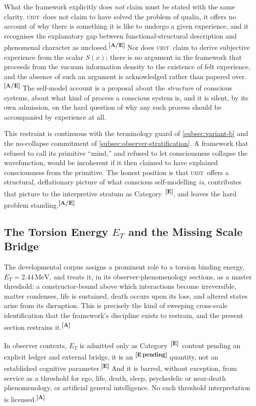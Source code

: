 \documentclass[12pt,a4paper,twoside]{article}
\theoremstyle{plain}
\theoremstyle{definition}
\theoremstyle{remark}
\newcommand{\UIDT}{\textsc{uidt}}
\newcommand{\MeV}{\,\mathrm{MeV}}
\newcommand{\catmark}[1]{\textsuperscript{\textsf{\textbf{[#1]}}}}
\newcommand{\ETorsion}{2.44\MeV} %
\begin{document}
What the framework explicitly does \emph{not} claim must be stated with the same clarity. \UIDT\ does not claim to have solved the problem of qualia, it offers no account of why there is something it is like to undergo a given experience, and it recognises the explanatory gap between functional-structural description and phenomenal character as unclosed.\catmark{A/E} Nor does \UIDT\ claim to derive subjective experience from the scalar $S(x)$; there is no argument in the framework that proceeds from the vacuum information density to the existence of felt experience, and the absence of such an argument is acknowledged rather than papered over.\catmark{A/E} The self-model account is a proposal about the \emph{structure} of conscious systems, about what kind of process a conscious system is, and it is silent, by its own admission, on the hard question of why any such process should be accompanied by experience at all.

This restraint is continuous with the terminology guard of \cref{subsec:variant-b} and the no-collapse commitment of \cref{subsec:observer-stratification}. A framework that refused to call its primitive ``mind,'' and refused to let consciousness collapse the wavefunction, would be incoherent if it then claimed to have explained consciousness from the primitive. The honest position is that \UIDT\ offers a structural, deflationary picture of what conscious self-modelling \emph{is}, contributes that picture to the interpretive stratum as Category~\catmark{E}, and leaves the hard problem standing.\catmark{A/E}

\subsection{The Torsion Energy \texorpdfstring{$E_T$}{E_T} and the Missing Scale Bridge}
\label{subsec:et-scale-bridge}

The developmental corpus assigns a prominent role to a torsion binding energy, $E_T = \ETorsion$, and treats it, in its observer-phenomenology sections, as a master threshold: a constructor-bound above which interactions become irreversible, matter condenses, life is sustained, death occurs upon its loss, and altered states arise from its disruption. This is precisely the kind of sweeping cross-scale identification that the framework's discipline exists to restrain, and the present section restrains it.\catmark{A}

In observer contexts, $E_T$ is admitted only as Category~\catmark{E}\ content pending an explicit ledger and external bridge, it is an \catmark{E\,pending} quantity, not an established cognitive parameter.\catmark{E} And it is barred, without exception, from service as a threshold for ego, life, death, sleep, psychedelic or near-death phenomenology, or artificial general intelligence. No such threshold interpretation is licensed.\catmark{A}
\end{document}

